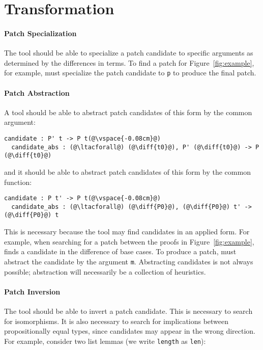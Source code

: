 \section{Transformation}


\paragraph{Patch Specialization} The tool should be able to specialize a patch candidate to specific arguments as determined by
the differences in terms. To find a patch for Figure~\ref{fig:example}, for example, \sysname
must specialize the patch candidate to \lstinline{p} to produce the final patch.

\paragraph{Patch Abstraction} A tool should be able to abstract patch candidates of this form by the common argument:

\begin{lstlisting}[language=coq]
  candidate : P' t -> P t(@\vspace{-0.08cm}@)
  candidate_abs : (@\ltacforall@) (@\diff{t0}@), P' (@\diff{t0}@) -> P (@\diff{t0}@)
\end{lstlisting}
and it should be able to abstract patch candidates of this form by the common function:

\begin{lstlisting}[language=coq]
  candidate : P t' -> P t(@\vspace{-0.08cm}@)
  candidate_abs : (@\ltacforall@) (@\diff{P0}@), (@\diff{P0}@) t' -> (@\diff{P0}@) t
\end{lstlisting} 

This is necessary because the tool may find candidates in an applied form.
For example, when searching for a patch between the proofs in Figure~\ref{fig:example},
\sysname finds a candidate in the difference of base cases. To produce a patch, 
\sysname must abstract the candidate by the argument \lstinline{m}.
Abstracting candidates is not always possible; abstraction will necessarily be a collection of heuristics.

\paragraph{Patch Inversion} The tool should be able to invert a patch candidate.
This is necessary to search for isomorphisms.
It is also necessary to search for implications between propositionally
equal types, since candidates may appear in the wrong direction.
For example, consider two list lemmas (we write \lstinline{length} as \lstinline{len}):

